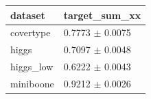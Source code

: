 \begin{tabular}{ll}
\toprule
dataset & target\_sum\_xx \\
\midrule
covertype & 0.7773 $\pm$ 0.0075 \\
higgs & 0.7097 $\pm$ 0.0048 \\
higgs\_low & 0.6222 $\pm$ 0.0043 \\
miniboone & 0.9212 $\pm$ 0.0026 \\
\bottomrule
\end{tabular}
